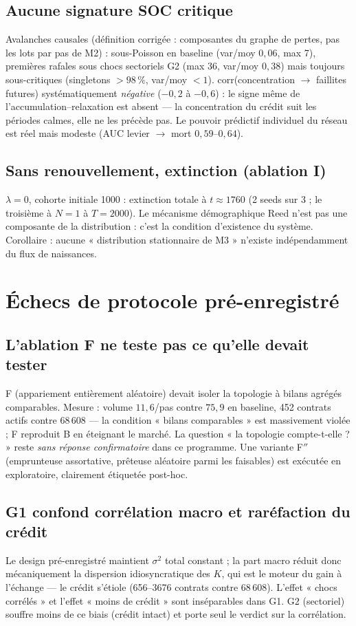 \documentclass[11pt,a4paper]{article}
\begin{document}
\subsection{Aucune signature SOC critique}
Avalanches causales (définition corrigée : composantes du graphe de pertes,
pas les lots par pas de M2) : sous-Poisson en baseline (var/moy $0{,}06$,
max 7), premières rafales sous chocs sectoriels G2 (max 36, var/moy
$0{,}38$) mais toujours sous-critiques (singletons $> 98\,\%$, var/moy
$< 1$). corr(concentration $\to$ faillites futures) systématiquement
\emph{négative} ($-0{,}2$ à $-0{,}6$) : le signe même de
l'accumulation--relaxation est absent — la concentration du crédit suit les
périodes calmes, elle ne les précède pas. Le pouvoir prédictif individuel
du réseau est réel mais modeste (AUC levier $\to$ mort $0{,}59$--$0{,}64$).

\subsection{Sans renouvellement, extinction (ablation I)}
$\lambda = 0$, cohorte initiale 1000 : extinction totale à $t \approx 1760$
(2 seeds sur 3 ; le troisième à $N = 1$ à $T = 2000$). Le mécanisme
démographique Reed n'est pas une composante de la distribution : c'est la
condition d'existence du système. Corollaire : aucune « distribution
stationnaire de M3 » n'existe indépendamment du flux de naissances.

\section{Échecs de protocole pré-enregistré}

\subsection{L'ablation F ne teste pas ce qu'elle devait tester}
F (appariement entièrement aléatoire) devait isoler la topologie à bilans
agrégés comparables. Mesure : volume $11{,}6$/pas contre $75{,}9$ en
baseline, 452 contrats actifs contre $68\,608$ — la condition « bilans
comparables » est massivement violée ; F reproduit B en éteignant le marché.
La question « la topologie compte-t-elle ? » reste \emph{sans réponse
confirmatoire} dans ce programme. Une variante F$''$ (emprunteuse
assortative, prêteuse aléatoire parmi les faisables) est exécutée en
exploratoire, clairement étiquetée post-hoc.

\subsection{G1 confond corrélation macro et raréfaction du crédit}
Le design pré-enregistré maintient $\sigma^2$ total constant ; la part macro
réduit donc mécaniquement la dispersion idiosyncratique des $K$, qui est le
moteur du gain à l'échange — le crédit s'étiole (656--3676 contrats contre
$68\,608$). L'effet « chocs corrélés » et l'effet « moins de crédit » sont
inséparables dans G1. G2 (sectoriel) souffre moins de ce biais (crédit
intact) et porte seul le verdict sur la corrélation.
\end{document}
